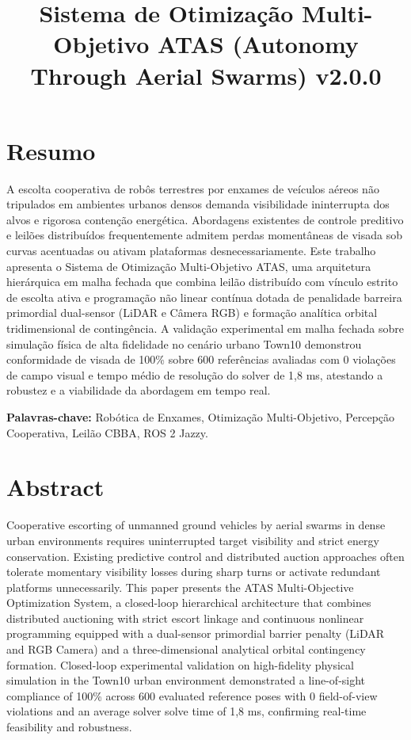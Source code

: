 \documentclass[
  brazilian,
  a4paper]{article}
\title{Sistema de Otimização Multi-Objetivo ATAS (Autonomy Through
Aerial Swarms) v2.0.0}
\author{}
\date{}
\begin{document}
\maketitle

\section*{Resumo}\label{resumo}

A escolta cooperativa de robôs terrestres por enxames de veículos aéreos
não tripulados em ambientes urbanos densos demanda visibilidade
ininterrupta dos alvos e rigorosa contenção energética. Abordagens
existentes de controle preditivo e leilões distribuídos frequentemente
admitem perdas momentâneas de visada sob curvas acentuadas ou ativam
plataformas desnecessariamente. Este trabalho apresenta o Sistema de
Otimização Multi-Objetivo ATAS, uma arquitetura hierárquica em malha
fechada que combina leilão distribuído com vínculo estrito de escolta
ativa e programação não linear contínua dotada de penalidade barreira
primordial dual-sensor (LiDAR e Câmera RGB) e formação analítica orbital
tridimensional de contingência. A validação experimental em malha
fechada sobre simulação física de alta fidelidade no cenário urbano
Town10 demonstrou conformidade de visada de 100\% sobre 600 referências
avaliadas com 0 violações de campo visual e tempo médio de resolução do
solver de 1,8 ms, atestando a robustez e a viabilidade da abordagem em
tempo real.

\textbf{Palavras-chave:} Robótica de Enxames, Otimização Multi-Objetivo,
Percepção Cooperativa, Leilão CBBA, ROS 2 Jazzy.

\section*{Abstract}\label{abstract}

Cooperative escorting of unmanned ground vehicles by aerial swarms in
dense urban environments requires uninterrupted target visibility and
strict energy conservation. Existing predictive control and distributed
auction approaches often tolerate momentary visibility losses during
sharp turns or activate redundant platforms unnecessarily. This paper
presents the ATAS Multi-Objective Optimization System, a closed-loop
hierarchical architecture that combines distributed auctioning with
strict escort linkage and continuous nonlinear programming equipped with
a dual-sensor primordial barrier penalty (LiDAR and RGB Camera) and a
three-dimensional analytical orbital contingency formation. Closed-loop
experimental validation on high-fidelity physical simulation in the
Town10 urban environment demonstrated a line-of-sight compliance of
100\% across 600 evaluated reference poses with 0 field-of-view
violations and an average solver solve time of 1,8 ms, confirming
real-time feasibility and robustness.
\end{document}
